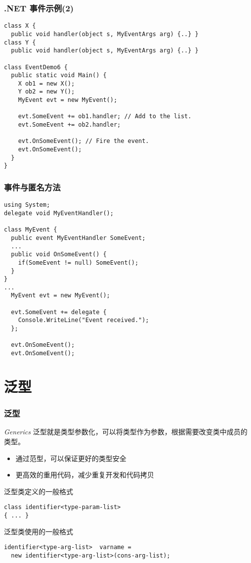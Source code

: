 \begin{frame}[fragile]
\frametitle{.NET 事件示例(2)}
\begin{lstlisting}
class X {
  public void handler(object s, MyEventArgs arg) {..} }
class Y {
  public void handler(object s, MyEventArgs arg) {..} }

class EventDemo6 {
  public static void Main() {
    X ob1 = new X();
    Y ob2 = new Y();
    MyEvent evt = new MyEvent();

    evt.SomeEvent += ob1.handler; // Add to the list.
    evt.SomeEvent += ob2.handler;

    evt.OnSomeEvent(); // Fire the event.
    evt.OnSomeEvent();
  }
}
\end{lstlisting}
\end{frame}

\begin{frame}[fragile]
\frametitle{事件与匿名方法}
\begin{lstlisting}
using System;
delegate void MyEventHandler();

class MyEvent {
  public event MyEventHandler SomeEvent;
  ...
  public void OnSomeEvent() {
    if(SomeEvent != null) SomeEvent();
  }
}
...
  MyEvent evt = new MyEvent();

  evt.SomeEvent += delegate {
    Console.WriteLine("Event received.");
  };

  evt.OnSomeEvent();
  evt.OnSomeEvent();

\end{lstlisting}

\end{frame}

\section{泛型}

\begin{frame}[fragile]
\frametitle{泛型}
\begin{block}{\textit{Generics}}
  \CJKindent 泛型就是类型参数化，可以将类型作为参数，根据需要改变类中成员的类型。
\end{block}

\begin{itemize}
\item 通过范型，可以保证更好的类型安全
\item 更高效的重用代码，减少重复开发和代码拷贝
\end{itemize}
\pause
泛型类定义的一般格式
\begin{lstlisting}
class identifier<type-param-list>
{ ... }
\end{lstlisting}
泛型类使用的一般格式
\begin{lstlisting}
identifier<type-arg-list>  varname =
  new identifier<type-arg-list>(cons-arg-list);
\end{lstlisting}
\end{frame}


